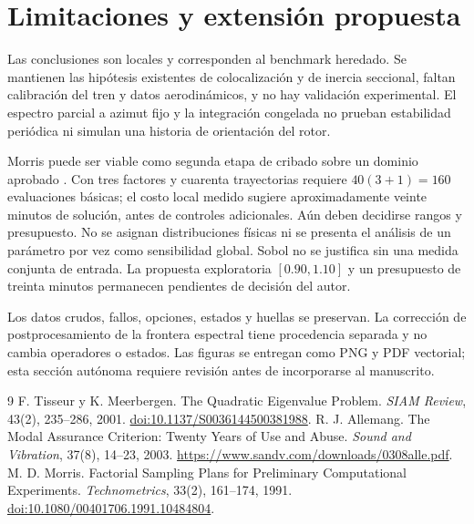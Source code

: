 \documentclass[11pt,a4paper]{article}
\begin{document}
\section{Limitaciones y extensión propuesta}
Las conclusiones son locales y corresponden al benchmark heredado. Se mantienen las hipótesis existentes de colocalización y de inercia seccional, faltan calibración del tren y datos aerodinámicos, y no hay validación experimental. El espectro parcial a azimut fijo y la integración congelada no prueban estabilidad periódica ni simulan una historia de orientación del rotor.

Morris puede ser viable como segunda etapa de cribado sobre un dominio aprobado \cite{morris1991}. Con tres factores y cuarenta trayectorias requiere $40(3+1)=160$ evaluaciones básicas; el costo local medido sugiere aproximadamente veinte minutos de solución, antes de controles adicionales. Aún deben decidirse rangos y presupuesto. No se asignan distribuciones físicas ni se presenta el análisis de un parámetro por vez como sensibilidad global. Sobol no se justifica sin una medida conjunta de entrada. La propuesta exploratoria $[0.90,1.10]$ y un presupuesto de treinta minutos permanecen pendientes de decisión del autor.

Los datos crudos, fallos, opciones, estados y huellas se preservan. La corrección de postprocesamiento de la frontera espectral tiene procedencia separada y no cambia operadores o estados. Las figuras se entregan como PNG y PDF vectorial; esta sección autónoma requiere revisión antes de incorporarse al manuscrito.

\begin{thebibliography}{9}
 F. Tisseur y K. Meerbergen. The Quadratic Eigenvalue Problem. \emph{SIAM Review}, 43(2), 235--286, 2001. \href{https://doi.org/10.1137/S0036144500381988}{doi:10.1137/S0036144500381988}.
 R. J. Allemang. The Modal Assurance Criterion: Twenty Years of Use and Abuse. \emph{Sound and Vibration}, 37(8), 14--23, 2003. \url{https://www.sandv.com/downloads/0308alle.pdf}.
 M. D. Morris. Factorial Sampling Plans for Preliminary Computational Experiments. \emph{Technometrics}, 33(2), 161--174, 1991. \href{https://doi.org/10.1080/00401706.1991.10484804}{doi:10.1080/00401706.1991.10484804}.
\end{thebibliography}
\end{document}
